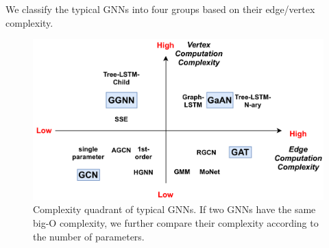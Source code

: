 We classify the typical GNNs into four groups based on their edge/vertex complexity.

\begin{figure}
	\centering
	\includegraphics[width=0.6\columnwidth]{figs/illustration/GNN_complexity_quadrant.png}
	\caption{Complexity quadrant of typical GNNs. If two GNNs have the same big-O complexity, we further compare their complexity according to the number of parameters.}
\end{figure}

